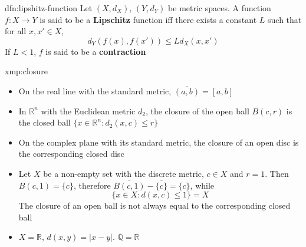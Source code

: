 \documentclass[landscape, 8pt]{extarticle}
\begin{document}
\begin{multicols}{3}
\begin{dfn}{dfn:lipshitz-function}{}
    Let $(X, d_{X}),\,(Y, d_{Y})$ be metric spaces. A function $f : X \to Y$ is said to be a \textbf{Lipschitz} function iff there exists a constant $L$ such that for all $x,x'\in X$,
    \[d_{Y}(f(x), f(x')) \le L d_{X}(x,x')\]
    If $L < 1$, $f$ is said to be a \textbf{contraction}
    
\end{dfn}

\begin{xmp}{xmp:closure}{}
    \begin{itemize}[leftmargin=*]
        \item On the real line with the standard metric, $\overline{(a,b)} = [a,b]$
        \item In $\mathbb{R}^{n}$ with the Euclidean metric $d_{2}$, the closure of the open ball $B(c,r)$ is the closed ball $\{x\in\mathbb{R}^{n}: d_{2}(x,c)\le r\}$
        \item On the complex plane with its standard metric, the closure of an open disc is the corresponding closed disc
        \item Let $X$ be a non-empty set with the discrete metric, $c\in X$ and $r =1$. Then $B(c,1) = \{c\}$, therefore $\overline{B(c,1)} - \overline{\{c\}} = \{c\}$, while
            \[\{x\in X : d(x,c) \le 1\} = X\]
            The closure of an open ball is not always equal to the corresponding closed ball
        \item $X = \mathbb{R},\,d(x,y) = \lvert x - y \rvert$. $\overline{\mathbb{Q}} = \mathbb{R}$
    \end{itemize}
\end{xmp}




\lipsum[1-12]
\end{multicols}
\end{document}
